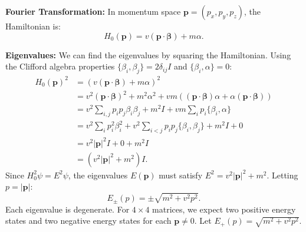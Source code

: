 \documentclass[11pt]{article}
\begin{document}
\textbf{Fourier Transformation:}
In momentum space $\mathbf{p} = (p_x, p_y, p_z)$, the Hamiltonian is:
\begin{equation}
H_0(\mathbf{p}) = v (\mathbf{p} \cdot \bm{\beta}) + m \alpha.
\label{eq:3D_H_project}
\end{equation}

\textbf{Eigenvalues:}
We can find the eigenvalues by squaring the Hamiltonian. Using the Clifford algebra properties $\{\beta_i, \beta_j\} = 2 \delta_{ij} I$ and $\{\beta_i, \alpha\} = 0$:
\begin{align} H_0(\mathbf{p})^2 &= (v (\mathbf{p} \cdot \bm{\beta}) + m \alpha)^2 \\ &= v^2 (\mathbf{p} \cdot \bm{\beta})^2 + m^2 \alpha^2 + vm ((\mathbf{p} \cdot \bm{\beta})\alpha + \alpha(\mathbf{p} \cdot \bm{\beta})) \\ &= v^2 \sum_{i,j} p_i p_j \beta_i \beta_j + m^2 I + vm \sum_i p_i \{\beta_i, \alpha\} \\ &= v^2 \sum_i p_i^2 \beta_i^2 + v^2 \sum_{i<j} p_i p_j \{\beta_i, \beta_j\} + m^2 I + 0 \\ &= v^2 |\mathbf{p}|^2 I + 0 + m^2 I \\ &= (v^2 |\mathbf{p}|^2 + m^2) I. \end{align}
Since $H_0^2 \psi = E^2 \psi$, the eigenvalues $E(\mathbf{p})$ must satisfy $E^2 = v^2 |\mathbf{p}|^2 + m^2$. Letting $p = |\mathbf{p}|$:
\begin{equation}
E_{\pm}(p) = \pm \sqrt{m^2 + v^2 p^2}.
\label{eq:3D_eigenvalues}
\end{equation}
Each eigenvalue is degenerate. For $4 \times 4$ matrices, we expect two positive energy states and two negative energy states for each $\mathbf{p} \neq 0$. Let $E_+(p) = \sqrt{m^2 + v^2 p^2}$.
\end{document}
